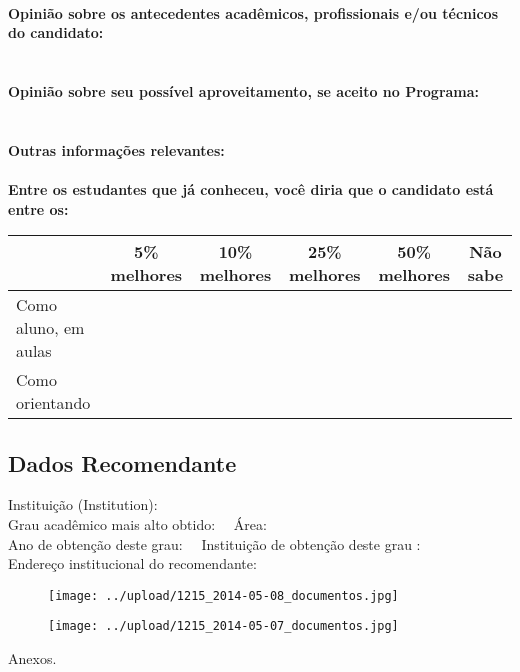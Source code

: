 \documentclass[11pt]{article}
\begin{document}
\\
\textbf{Opinião sobre os antecedentes acadêmicos, profissionais e/ou técnicos do candidato:}
\\\\
\\
\textbf{Opinião sobre seu possível aproveitamento, se aceito no Programa:}
\\\\ 
\\
\textbf{Outras informações relevantes:} \\
\\[0.3cm]
\textbf{Entre os estudantes que já conheceu, você diria que o candidato está entre os:}
\\
\begin{tabular}{|l|c|c|c|c|c|}
\hline
 & 5\% melhores & 10\% melhores & 25\% melhores & 50\% melhores & Não sabe \\
\hline
Como aluno, em aulas &  &  &  &  & \\
\hline
Como orientando &  &  &  &  & \\
\hline
\end{tabular}
\subsection*{Dados Recomendante} 
	Instituição (Institution): 
\\ 
	Grau acadêmico mais alto obtido: 
	\ \ Área: 
	\\
	Ano de obtenção deste grau: 
	\ \ 
	Instituição de obtenção deste grau : 
	\\ 
	Endereço institucional do recomendante: \\ 	
\begin{figure}[!htb]
\texttt{[image: ../upload/1215\_2014-05-08\_documentos.jpg]}
\end{figure}	
\begin{figure}[!htb]
\texttt{[image: ../upload/1215\_2014-05-07\_documentos.jpg]}
\end{figure} 
\begin{center}
Anexos.
\end{center}
\end{document}
